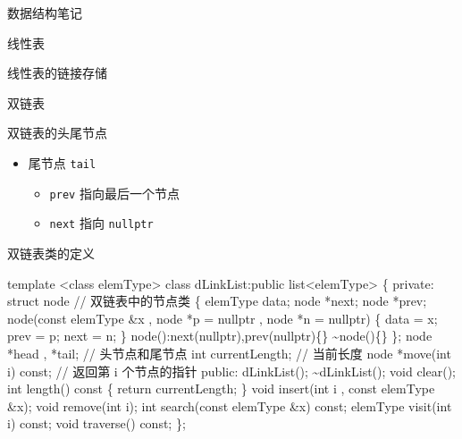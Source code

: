 \documentclass[
  ignorenonframetext,
]{beamer}
\newenvironment{Shaded}{}{}
\newcommand{\NormalTok}[1]{#1}
\providecommand{\tightlist}{%
  \setlength{\itemsep}{0pt}\setlength{\parskip}{0pt}}
\begin{document}
\begin{frame}[fragile]{数据结构笔记}
\begin{block}{线性表}
\begin{block}{线性表的链接存储}
\begin{block}{双链表}
\begin{block}{双链表的头尾节点}
\begin{itemize}
  \begin{itemize}
  \tightlist
  \item
    \texttt{prev} 指向 \texttt{nullptr}
  \item
    \texttt{next} 指向首节点
  \end{itemize}
\item
  尾节点 \texttt{tail}

  \begin{itemize}
  \tightlist
  \item
    \texttt{prev} 指向最后一个节点
  \item
    \texttt{next} 指向 \texttt{nullptr}
  \end{itemize}
\end{itemize}

\end{block}

\begin{block}{双链表类的定义}
\protect{}\label{ux53ccux94feux8868ux7c7bux7684ux5b9aux4e49}
\begin{Shaded}
\begin{Highlighting}[]
\NormalTok{template \textless{}class elemType\textgreater{}}
\NormalTok{class dLinkList:public list\textless{}elemType\textgreater{}}
\NormalTok{\{}
\NormalTok{  private:}
\NormalTok{    struct node                                                         // 双链表中的节点类}
\NormalTok{    \{}
\NormalTok{      elemType data;}
\NormalTok{      node *next;}
\NormalTok{      node *prev;}
\NormalTok{      node(const elemType \&x , node *p = nullptr , node *n = nullptr)}
\NormalTok{      \{}
\NormalTok{        data = x;}
\NormalTok{        prev = p;}
\NormalTok{        next = n;}
\NormalTok{      \}}
\NormalTok{      node():next(nullptr),prev(nullptr)\{\}}
\NormalTok{      \textasciitilde{}node()\{\}}
\NormalTok{    \};}
\NormalTok{    node *head , *tail;                                                  // 头节点和尾节点}
\NormalTok{    int currentLength;                                                   // 当前长度}
\NormalTok{    node *move(int i) const;                                             // 返回第 i 个节点的指针}
\NormalTok{  public:}
\NormalTok{    dLinkList();}
\NormalTok{    \textasciitilde{}dLinkList();}
\NormalTok{    void clear();}
\NormalTok{    int length() const}
\NormalTok{    \{}
\NormalTok{      return currentLength;}
\NormalTok{    \}}
\NormalTok{    void insert(int i , const elemType \&x);}
\NormalTok{    void remove(int i);}
\NormalTok{    int search(const elemType \&x) const;}
\NormalTok{    elemType visit(int i) const;}
\NormalTok{    void traverse() const;}
\NormalTok{\};}
\end{Highlighting}
\end{Shaded}
\end{block}


\end{block}
\end{block}
\end{block}
\end{frame}
\end{document}
